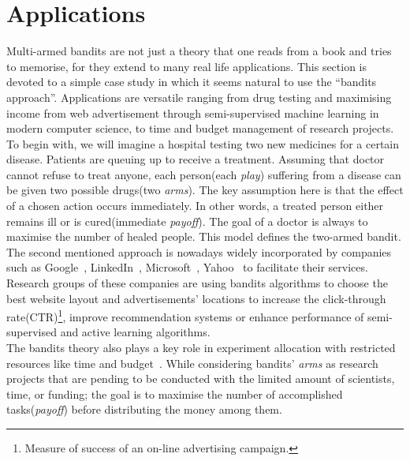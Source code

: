 \documentclass[12pt, a4paper, pdflatex, leqno, twoside]{report}
\begin{document}
\section{Applications} %
Multi-armed bandits are not just a theory that one reads from a book and tries to 
memorise, for they extend to many real life applications. This section is devoted 
to a simple case study in which it seems natural to use the ``bandits approach''. 
Applications are versatile ranging from drug testing and maximising income from 
web advertisement through semi-supervised machine learning in modern computer 
science, to time and budget management of research projects.\\

To begin with, we will imagine a hospital testing two new medicines for a certain 
disease. Patients are queuing up to receive a treatment. Assuming that doctor 
cannot refuse to treat anyone, each person(each 
\emph{play}) suffering from a disease can be given two possible drugs(two \emph{arms}). The key 
assumption here is that the effect of a chosen action occurs immediately. In other 
words, a treated person either remains ill or is cured(immediate \emph{payoff}). 
The goal of a doctor is always to maximise the number of healed people. This model 
defines the two-armed bandit.\\

The second mentioned approach is nowadays widely incorporated by companies such 
as Google~\citep{AYPSze12, ASMB:ASMB874}, 
LinkedIn~\citep{Tang:2013:AAF:2505515.2514700}, 
Microsoft~\citep{graepel2010web}, Yahoo~\citep{Li:2010:CAP:1772690.1772758} to facilitate
their services. Research groups of these companies are using bandits algorithms 
to choose the best website layout and advertisements' locations to increase 
the click-through rate(CTR)\footnote{Measure of success of an on-line advertising 
campaign.}, improve recommendation systems or enhance performance of semi-supervised and active learning algorithms.\\

The bandits theory also plays a key role in experiment allocation with 
restricted resources like time and budget~\citep{gittins+glazebrook+weber}. 
While considering bandits' \emph{arms} as research projects that are pending to be conducted 
with the limited amount of scientists, time, or funding; the goal is to maximise the number of 
accomplished tasks(\emph{payoff}) before distributing the money among them.\\
\end{document}
